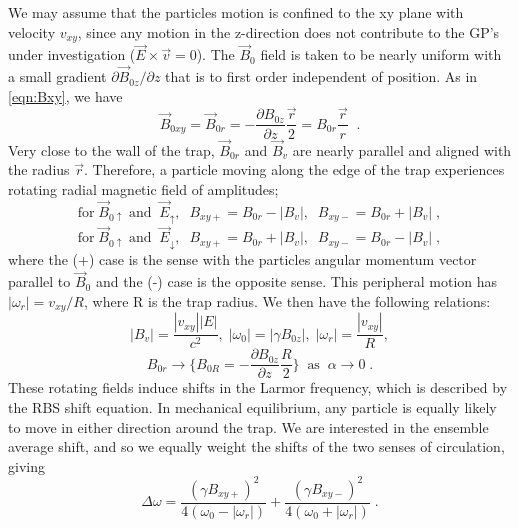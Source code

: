 We may assume that the particles motion is confined to the xy plane
with velocity $v_{xy}$, since any motion in the z-direction does not
contribute to the GP's under investigation
($\vec{E} \times \vec{v} = 0$).  The $\vec{B}_0$ field is taken to be
nearly uniform with a small gradient $\partial\vec{B}_{0z}/\partial z$
that is to first order independent of position.  As in \ref{eqn:Bxy},
we have
%
\begin{equation}
\vec{B}_{0xy} = \vec{B}_{0r} = - \frac{\partial B_{0z}}{\partial z} \frac{\vec{r}}{2} = B_{0r} \frac{\vec{r}}{r} \;\; .
\end{equation}
%
Very close to the wall of the trap, $\vec{B}_{0r}$ and $\vec{B}_{v}$
are nearly parallel and aligned with the radius $\vec{r}$.  Therefore,
a particle moving along the edge of the trap experiences rotating
radial magnetic field of amplitudes;
%
\begin{equation}
\textrm{for} \; \vec{B}_{0 \uparrow} \; \textrm{and} \;\; 
\vec{E}_{\uparrow}, \;\; B_{xy +} = B_{0r} - |B_{v}|, 
\;\; B_{xy -} = B_{0r} + |B_{v}| \; ,
\end{equation}
%
\begin{equation}
\textrm{for} \; \vec{B}_{0 \uparrow} \; \textrm{and} \;\; 
\vec{E}_{\downarrow}, \;\; B_{xy +} = B_{0r} + |B_{v}|, 
\;\; B_{xy -} = B_{0r} - |B_{v}| \; ,
\end{equation}
%
where the (+) case is the sense with the particles angular momentum
vector parallel to $\vec{B}_0$ and the (-) case is the opposite sense.
This peripheral motion has $|\omega_r| = v_{xy}/R$, where R is the
trap radius.  We then have the following relations:
\begin{equation}
\label{eqn:relations}
|B_v| = \frac{|v_{xy}||E|}{c^2}, \; |\omega_0| = |\gamma B_{0z}|, \; |\omega_r| = \frac{|v_{xy}|}{R},
\end{equation}
%
\begin{equation*}
B_{0r} \rightarrow \lbrace B_{0R} = - \frac{\partial B_{0z}}{\partial z} \frac{R}{2} \rbrace \;\; \textrm{as} \;\; \alpha \rightarrow 0 \; .
\end{equation*}
%
These rotating fields induce shifts in the Larmor frequency, which is
described by the RBS shift equation.  In mechanical equilibrium, any
particle is equally likely to move in either direction around the
trap.  We are interested in the ensemble average shift, and so we
equally weight the shifts of the two senses of circulation, giving
%
\begin{equation}
\Delta \omega = \frac{(\gamma B_{xy+})^2}{4(\omega_0 - |\omega_r|)} + \frac{(\gamma B_{xy-})^2}{4(\omega_0 + |\omega_r|)} \;.
\end{equation}
